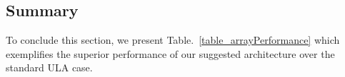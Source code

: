 \subsection*{Summary}
To conclude this section, we present Table.~\ref{table_arrayPerformance} which exemplifies the superior performance of our suggested architecture over the standard ULA case.
\begin{table}[h!]
    \caption{Comparing performances of classical ULA and the proposed feedback based architecture, with gain mismatch $r$.}
    \centering
    \label{table_arrayPerformance}
\end{table}